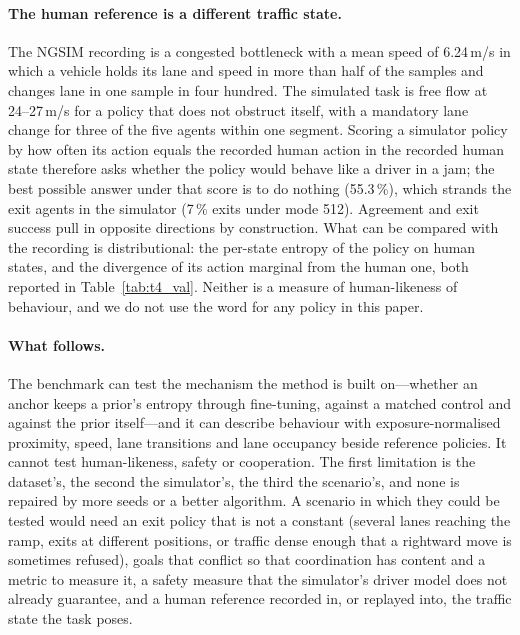 \paragraph{The human reference is a different traffic state.}
The NGSIM recording is a congested bottleneck with a mean speed of 6.24\,m/s in which a vehicle holds its lane and speed in more than half of the samples and changes lane in one sample in four hundred. The simulated task is free flow at 24--27\,m/s for a policy that does not obstruct itself, with a mandatory lane change for three of the five agents within one segment. Scoring a simulator policy by how often its action equals the recorded human action in the recorded human state therefore asks whether the policy would behave like a driver in a jam; the best possible answer under that score is to do nothing (55.3\,\%), which strands the exit agents in the simulator (7\,\% exits under mode 512). Agreement and exit success pull in opposite directions by construction. What can be compared with the recording is distributional: the per-state entropy of the policy on human states, and the divergence of its action marginal from the human one, both reported in Table~\ref{tab:t4_val}. Neither is a measure of human-likeness of behaviour, and we do not use the word for any policy in this paper.

\paragraph{What follows.}
The benchmark can test the mechanism the method is built on---whether an anchor keeps a prior's entropy through fine-tuning, against a matched control and against the prior itself---and it can describe behaviour with exposure-normalised proximity, speed, lane transitions and lane occupancy beside reference policies. It cannot test human-likeness, safety or cooperation. The first limitation is the dataset's, the second the simulator's, the third the scenario's, and none is repaired by more seeds or a better algorithm. A scenario in which they could be tested would need an exit policy that is not a constant (several lanes reaching the ramp, exits at different positions, or traffic dense enough that a rightward move is sometimes refused), goals that conflict so that coordination has content and a metric to measure it, a safety measure that the simulator's driver model does not already guarantee, and a human reference recorded in, or replayed into, the traffic state the task poses.


